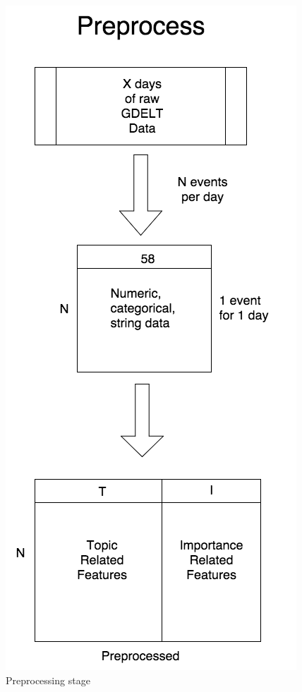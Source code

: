 \begin{figure}[ht]
\vskip 0.2in
\begin{center}
\centerline{\includegraphics[scale=0.15]{images/preprocess_vertical.png}}
\caption{Preprocessing stage}
\end{center}
\vskip -0.2in
\label{fig:preprocess}
\end{figure} 


